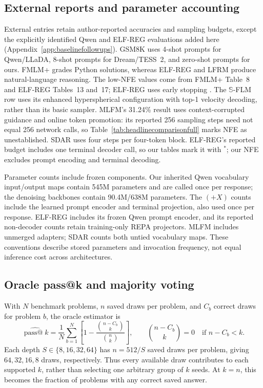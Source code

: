 \documentclass{article}
\newcommand{\rev}[1]{{\color{blue}#1}}
\begin{document}
\subsection{External reports and parameter accounting}
\rev{External entries retain author-reported accuracies and sampling budgets, except the explicitly identified Qwen and ELF-REG evaluations added here (Appendix~\ref{app:baselinefollowups}).} GSM8K uses 4-shot prompts for Qwen/LLaDA, 8-shot prompts for Dream/TESS~2, and zero-shot prompts for ours. FMLM+ grades Python solutions, whereas ELF-REG and LFRM produce natural-language reasoning. The low-NFE values come from FMLM+ Table~8 and ELF-REG Tables~13 and~17; ELF-REG uses early stopping \citep{posterior,scalingdlm}. The $\mathbb S$-FLM row uses its enhanced hyperspherical configuration with top-1 velocity decoding, rather than its basic sampler. MLFM's 31.24\% result uses context-corrupted guidance and online token promotion: its reported 256 sampling steps need not equal 256 network calls, so Table~\ref{tab:headlinecomparisonfull} marks NFE as unestablished. SDAR uses four steps per four-token block. ELF-REG's reported budget includes one terminal decoder call, so our tables mark it with $^{*}$; our NFE excludes prompt encoding and terminal decoding.

Parameter counts include frozen components. Our inherited Qwen vocabulary input/output maps contain 545M parameters and are called once per response; the denoising backbones contain 90.4M/638M parameters. The $(+X)$ counts include the learned prompt encoder and terminal projection, also used once per response. ELF-REG includes its frozen Qwen prompt encoder, and its reported non-decoder counts retain training-only REPA projectors. MLFM includes unmerged adapters; SDAR counts both untied vocabulary maps. These conventions describe stored parameters and invocation frequency, not equal inference cost across architectures.

\subsection{Oracle pass@k and majority voting}
\label{app:passkprotocol}

With $N$ benchmark problems, $n$ saved draws per problem, and $C_b$ correct draws for problem $b$, the oracle estimator is
\begin{equation}
 \widehat{\operatorname{pass@}k}
 =\frac{1}{N}\sum_{b=1}^{N}
 \left[1-\frac{\binom{n-C_b}{k}}{\binom{n}{k}}\right],
 \qquad \binom{n-C_b}{k}=0\quad\text{if }n-C_b<k.
\end{equation}
Each depth $S\in\{8,16,32,64\}$ has $n=512/S$ saved draws per problem, giving $64,32,16,8$ draws, respectively. Thus every available draw contributes to each supported $k$, rather than selecting one arbitrary group of $k$ seeds. At $k=n$, this becomes the fraction of problems with any correct saved answer.
\end{document}
